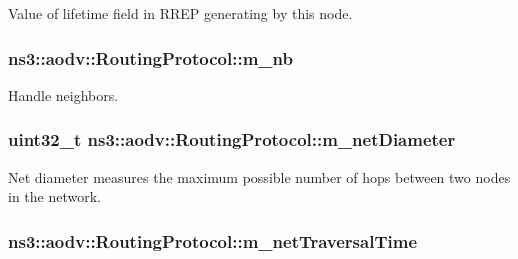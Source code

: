 Value of lifetime field in R\+R\+EP generating by this node. 

\subsubsection[{\texorpdfstring{m\+\_\+nb}{m_nb}}]{ ns3\+::aodv\+::\+Routing\+Protocol\+::m\+\_\+nb\hspace{0.3cm}{\ttfamily [private]}}\hypertarget{classns3_1_1aodv_1_1RoutingProtocol_ac1f61cf6b680f2fe8c82983d18bfd3cd}{}\label{classns3_1_1aodv_1_1RoutingProtocol_ac1f61cf6b680f2fe8c82983d18bfd3cd}


Handle neighbors. 

\subsubsection[{\texorpdfstring{m\+\_\+net\+Diameter}{m_netDiameter}}]{\setlength{\rightskip}{0pt plus 5cm}uint32\+\_\+t ns3\+::aodv\+::\+Routing\+Protocol\+::m\+\_\+net\+Diameter\hspace{0.3cm}{\ttfamily [private]}}\hypertarget{classns3_1_1aodv_1_1RoutingProtocol_a563c2234b89a44628f8e71b38e7c60ec}{}\label{classns3_1_1aodv_1_1RoutingProtocol_a563c2234b89a44628f8e71b38e7c60ec}


Net diameter measures the maximum possible number of hops between two nodes in the network. 

\subsubsection[{\texorpdfstring{m\+\_\+net\+Traversal\+Time}{m_netTraversalTime}}]{ ns3\+::aodv\+::\+Routing\+Protocol\+::m\+\_\+net\+Traversal\+Time\hspace{0.3cm}{\ttfamily [private]}}\hypertarget{classns3_1_1aodv_1_1RoutingProtocol_a4642e67ba68a7ef40405f5773650ea1a}{}\label{classns3_1_1aodv_1_1RoutingProtocol_a4642e67ba68a7ef40405f5773650ea1a}


